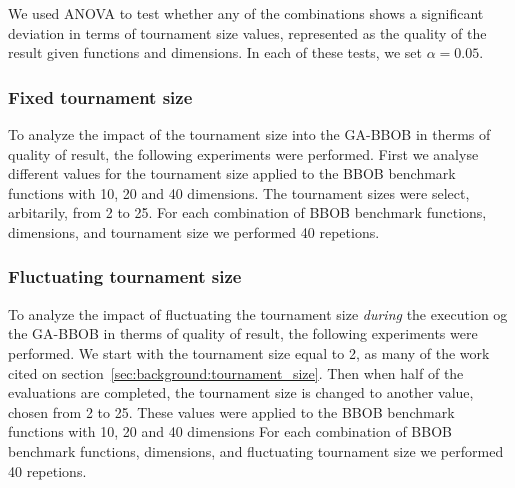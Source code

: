 We used ANOVA to test whether any of the combinations shows a
significant deviation in terms of tournament size values, represented as the
quality of the result given functions and dimensions. In each of these tests, we set
$\alpha = 0.05$.

\subsubsection*{Fixed tournament size}

To analyze the impact of the tournament size into the GA-BBOB in therms of quality of result, the following experiments were performed. First we analyse different values for the tournament size applied to the BBOB benchmark functions with 10, 20 and 40 dimensions. The tournament sizes were select, arbitarily, from 2 to 25. For each combination of BBOB benchmark functions, dimensions, and tournament size we performed 40 repetions.


\subsubsection*{Fluctuating tournament size}

To analyze the impact of fluctuating the tournament size \textit{during} the execution og the GA-BBOB in therms of quality of result, the following experiments were performed. We start with the tournament size equal to 2, as many of the work cited on section~\ref{sec:background:tournament_size}. Then when half of the evaluations are completed, the tournament size is changed to another value, chosen from 2 to 25. These values were applied to the BBOB benchmark functions with 10, 20 and 40 dimensions For each combination of BBOB benchmark functions, dimensions, and fluctuating tournament size we performed 40 repetions.



